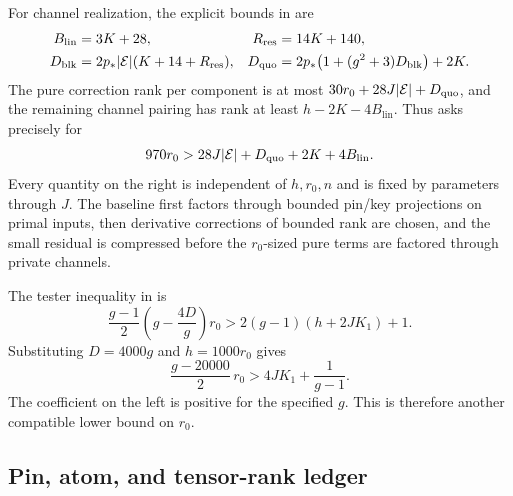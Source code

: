 For channel realization, the explicit bounds in
are
\[
\begin{aligned}
 B_{\mathrm{lin}}&=3K+28,&
 R_{\mathrm{res}}&=14K+140,\\
 D_{\mathrm{blk}}&=2p_*|\mathcal E|(K+14+R_{\mathrm{res}}),&
 D_{\mathrm{quo}}&=2p_*\bigl(1+(g^2+3)D_{\mathrm{blk}}\bigr)+2K.
\end{aligned}
\]
The pure correction rank per component is at most
\(30r_0+28J|\mathcal E|+D_{\mathrm{quo}}\), and the remaining channel
pairing has rank at least \(h-2K-4B_{\mathrm{lin}}\).
Thus  asks precisely for
\begin{equation}
       970r_0>28J|\mathcal E|+D_{\mathrm{quo}}+2K+4B_{\mathrm{lin}}.
 \label{eq:ledger-realization-demand}
\end{equation}
Every quantity on the right is independent of \(h,r_0,n\)
and is fixed by parameters through \(J\).
The baseline first factors through bounded pin/key projections on
primal inputs, then derivative corrections of bounded rank are
chosen, and the small residual is compressed before the
\(r_0\)-sized pure terms are factored through private channels.

The tester inequality in  is
\begin{equation}
 \frac{g-1}{2}\left(g-\frac{4D}{g}\right)r_0
          >2(g-1)(h+2JK_1)+1.
 \label{eq:ledger-pure-tester-demand}
\end{equation}
Substituting \(D=4000g\) and \(h=1000r_0\) gives
\[
       \frac{g-20000}{2}\,r_0
             >4JK_1+\frac1{g-1}.
\]
The coefficient on the left is positive for the specified \(g\).
This is therefore another compatible lower bound on \(r_0\).

\subsection{Pin, atom, and tensor-rank ledger}

